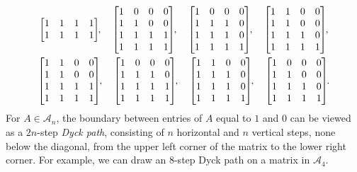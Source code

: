 \documentclass[12pt]{amsart}
\theoremstyle{definition}
\numberwithin{equation}{section}
\newcommand{\A}{\mathcal{A}}
\newcommand{\ntksp}{\negthickspace}
\begin{document}
\begin{equation}
\begin{gathered}
\begin{bmatrix}
    1 & 1 & 1 & 1\\
    1 & 1 & 1 & 1
  \end{bmatrix}\ntksp,
  \quad
  \begin{bmatrix}
    1 & 0 & 0 & 0\\
    1 & 1 & 0 & 0\\
    1 & 1 & 1 & 1\\
    1 & 1 & 1 & 1
  \end{bmatrix}\ntksp,
  \quad
  \begin{bmatrix}
    1 & 0 & 0 & 0\\
    1 & 1 & 1 & 0\\
    1 & 1 & 1 & 0\\
    1 & 1 & 1 & 1
  \end{bmatrix}\ntksp,
  \quad
  \begin{bmatrix}
    1 & 1 & 0 & 0\\
    1 & 1 & 0 & 0\\
    1 & 1 & 1 & 0\\
    1 & 1 & 1 & 1
  \end{bmatrix}\ntksp,
  \\
  \begin{bmatrix}
    1 & 1 & 0 & 0\\
    1 & 1 & 0 & 0\\
    1 & 1 & 1 & 1\\
    1 & 1 & 1 & 1
  \end{bmatrix}\ntksp,
  \quad
  \begin{bmatrix}
    1 & 0 & 0 & 0\\
    1 & 1 & 1 & 0\\
    1 & 1 & 1 & 1\\
    1 & 1 & 1 & 1
  \end{bmatrix}\ntksp,
  \quad
  \begin{bmatrix}
    1 & 1 & 0 & 0\\
    1 & 1 & 1 & 0\\
    1 & 1 & 1 & 0\\
    1 & 1 & 1 & 1
  \end{bmatrix}\ntksp,
  \quad
  \begin{bmatrix}
    1 & 0 & 0 & 0\\
    1 & 1 & 0 & 0\\
    1 & 1 & 1 & 0\\
    1 & 1 & 1 & 1
  \end{bmatrix}\ntksp.
  \end{gathered}
\end{equation}
For $A \in \A_n$, the boundary between entries of $A$ equal to $1$ and $0$
can be viewed as a $2n$-step {\em Dyck path},
consisting of $n$ horizontal
and $n$ vertical steps, none below the diagonal,
from the upper left corner of the
matrix to the lower right corner.
For example, we can draw an $8$-step Dyck path on a matrix in $\A_4$.
\end{document}
